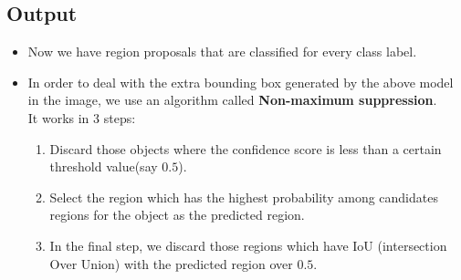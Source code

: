 \subsection{Output}
\begin{itemize}
    \item Now we have region proposals that are classified for every class label. 
    
    \item In order to deal with the extra bounding box generated by the above model in the image, we use an algorithm called \textbf{Non-maximum suppression}.\\
    It works in 3 steps:
    \begin{enumerate}
        \item Discard those objects where the confidence score is less than a certain threshold value(say $0.5$).

        \item Select the region which has the highest probability among candidates regions for the object as the predicted region.

        \item In the final step, we discard those regions which have IoU (intersection Over Union) with the predicted region over $0.5$.

    \end{enumerate}
\end{itemize}






























